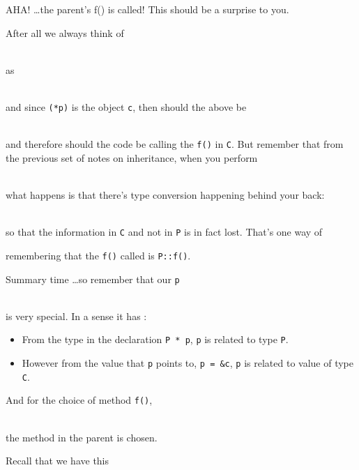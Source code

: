 AHA! \ldots the parent's f() is called! This should be a surprise to you.

After all we always think of

\\

as

\\

and since \verb!(*p)! is the object \verb!c!, then should the above be

\\

and therefore should the code be calling the \verb!f()! in \verb!C!. But remember that from the previous set of notes on inheritance, when you perform

\\

what happens is that there's type conversion happening
behind your back:

\\

so that the information in \verb!C! and not in \verb!P! is in fact lost.
That's one way of

remembering that the \verb!f()! called is \verb!P::f()!.

Summary time \ldots so remember that our \verb!p!

\\

is very special. In a sense it has :

\begin{itemize}
\item
  From the type in the declaration \verb!P * p!, \verb!p! is related to type \verb!P!.
\item
  However from the value that \verb!p! points to, \verb!p = &c!, \verb!p! is related to value of type \verb!C!.
\end{itemize}

And for the choice of method \verb!f()!,

\\

the method in the parent is chosen.

\newpage{}

Recall that we have this

